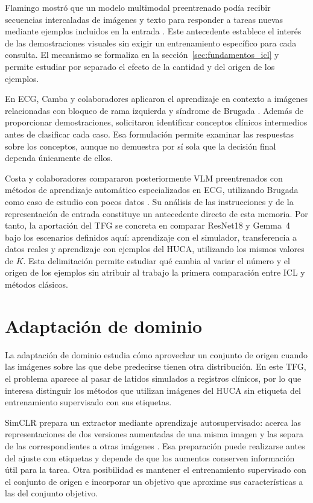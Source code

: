 Flamingo mostró que un modelo multimodal preentrenado podía recibir secuencias intercaladas de imágenes y texto para responder a tareas nuevas mediante ejemplos incluidos en la entrada \cite{alayrac2022}. Este antecedente establece el interés de las demostraciones visuales sin exigir un entrenamiento específico para cada consulta. El mecanismo se formaliza en la sección~\ref{sec:fundamentos_icl} y permite estudiar por separado el efecto de la cantidad y del origen de los ejemplos.

En ECG, Camba y colaboradores aplicaron el aprendizaje en contexto a imágenes relacionadas con bloqueo de rama izquierda y síndrome de Brugada \cite{camba2026icl}. Además de proporcionar demostraciones, solicitaron identificar conceptos clínicos intermedios antes de clasificar cada caso. Esa formulación permite examinar las respuestas sobre los conceptos, aunque no demuestra por sí sola que la decisión final dependa únicamente de ellos.

Costa y colaboradores compararon posteriormente VLM preentrenados con métodos de aprendizaje automático especializados en ECG, utilizando Brugada como caso de estudio con pocos datos \cite{costa2026fewshot}. Su análisis de las instrucciones y de la representación de entrada constituye un antecedente directo de esta memoria. Por tanto, la aportación del TFG se concreta en comparar ResNet18 y Gemma~4 bajo los escenarios definidos aquí: aprendizaje con el simulador, transferencia a datos reales y aprendizaje con ejemplos del HUCA, utilizando los mismos valores de \(K\). Esta delimitación permite estudiar qué cambia al variar el número y el origen de los ejemplos sin atribuir al trabajo la primera comparación entre ICL y métodos clásicos.

\section{Adaptación de dominio}
\label{sec:antecedentes_adaptacion}
\label{sec:antecedentes_adaptacion_cnn}

La adaptación de dominio estudia cómo aprovechar un conjunto de origen cuando las imágenes sobre las que debe predecirse tienen otra distribución. En este TFG, el problema aparece al pasar de latidos simulados a registros clínicos, por lo que interesa distinguir los métodos que utilizan imágenes del HUCA sin etiqueta del entrenamiento supervisado con sus etiquetas.

SimCLR prepara un extractor mediante aprendizaje autosupervisado: acerca las representaciones de dos versiones aumentadas de una misma imagen y las separa de las correspondientes a otras imágenes \cite{chen2020simclr}. Esa preparación puede realizarse antes del ajuste con etiquetas y depende de que los aumentos conserven información útil para la tarea. Otra posibilidad es mantener el entrenamiento supervisado con el conjunto de origen e incorporar un objetivo que aproxime sus características a las del conjunto objetivo.

